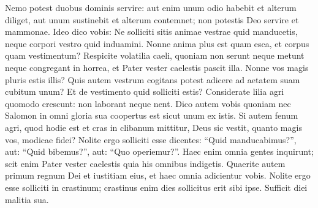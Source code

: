 \begin{biblechapter}
\begin{biblechapter}
\begin{biblechapter}
\begin{biblechapter}
\begin{biblechapter}
\begin{biblechapter}
\verse Nemo potest duobus dominis servire: aut enim unum odio habebit et alterum diliget, aut unum sustinebit et alterum contemnet; non potestis Deo servire et mammonae.
 \verse Ideo dico vobis: Ne solliciti sitis animae vestrae quid manducetis, neque corpori vestro quid induamini. Nonne anima plus est quam esca, et corpus quam vestimentum? 
\verse Respicite volatilia caeli, quoniam non serunt neque metunt neque congregant in horrea, et Pater vester caelestis pascit illa. Nonne vos magis pluris estis illis? 
\verse Quis autem vestrum cogitans potest adicere ad aetatem suam cubitum unum? 
\verse Et de vestimento quid solliciti estis? Considerate lilia agri quomodo crescunt: non laborant neque nent. 
\verse Dico autem vobis quoniam nec Salomon in omni gloria sua coopertus est sicut unum ex istis. 
\verse Si autem fenum agri, quod hodie est et cras in clibanum mittitur, Deus sic vestit, quanto magis vos, modicae fidei? 
\verse Nolite ergo solliciti esse dicentes: “Quid manducabimus?”, aut: “Quid bibemus?”, aut: “Quo operiemur?”. 
\verse Haec enim omnia gentes inquirunt; scit enim Pater vester caelestis quia his omnibus indigetis. 
\verse Quaerite autem primum regnum Dei et iustitiam eius, et haec omnia adicientur vobis. 
\verse Nolite ergo esse solliciti in crastinum; crastinus enim dies sollicitus erit sibi ipse. Sufficit diei malitia sua.
 

\end{biblechapter}
\end{biblechapter}
\end{biblechapter}
\end{biblechapter}
\end{biblechapter}
\end{biblechapter}
